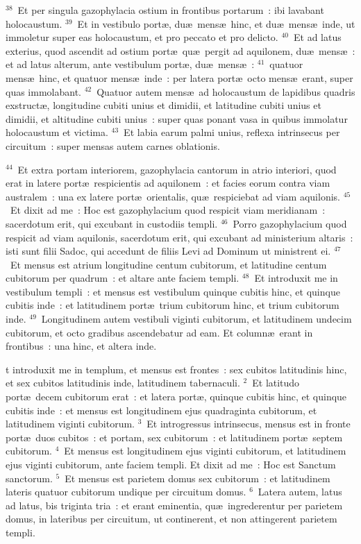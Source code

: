 ${}^{38}$~Et per singula gazophylacia ostium in frontibus portarum~: ibi lavabant holocaustum.
${}^{39}$~Et in vestibulo port\ae , du\ae\ mens\ae\ hinc, et du\ae\ mens\ae\ inde, ut immoletur super eas holocaustum, et pro peccato et pro delicto.
${}^{40}$~Et ad latus exterius, quod ascendit ad ostium port\ae\ qu\ae\ pergit ad aquilonem, du\ae\ mens\ae~: et ad latus alterum, ante vestibulum port\ae , du\ae\ mens\ae~:
${}^{41}$~quatuor mens\ae\ hinc, et quatuor mens\ae\ inde~: per latera port\ae\ octo mens\ae\ erant, super quas immolabant.
${}^{42}$~Quatuor autem mens\ae\ ad holocaustum de lapidibus quadris exstruct\ae , longitudine cubiti unius et dimidii, et latitudine cubiti unius et dimidii, et altitudine cubiti unius~: super quas ponant vasa in quibus immolatur holocaustum et victima.
${}^{43}$~Et labia earum palmi unius, reflexa intrinsecus per circuitum~: super mensas autem carnes oblationis.


${}^{44}$~Et extra portam interiorem, gazophylacia cantorum in atrio interiori, quod erat in latere port\ae\ respicientis ad aquilonem~: et facies eorum contra viam australem~: una ex latere port\ae\ orientalis, qu\ae\ respiciebat ad viam aquilonis.
${}^{45}$~Et dixit ad me~: Hoc est gazophylacium quod respicit viam meridianam~: sacerdotum erit, qui excubant in custodiis templi.
${}^{46}$~Porro gazophylacium quod respicit ad viam aquilonis, sacerdotum erit, qui excubant ad ministerium altaris~: isti sunt filii Sadoc, qui accedunt de filiis Levi ad Dominum ut ministrent ei.
${}^{47}$~Et mensus est atrium longitudine centum cubitorum, et latitudine centum cubitorum per quadrum~: et altare ante faciem templi.
${}^{48}$~Et introduxit me in vestibulum templi~: et mensus est vestibulum quinque cubitis hinc, et quinque cubitis inde~: et latitudinem port\ae\ trium cubitorum hinc, et trium cubitorum inde.
${}^{49}$~Longitudinem autem vestibuli viginti cubitorum, et latitudinem undecim cubitorum, et octo gradibus ascendebatur ad eam. Et column\ae\ erant in frontibus~: una hinc, et altera inde.

\bchapter
{}t introduxit me in templum, et mensus est frontes~: sex cubitos latitudinis hinc, et sex cubitos latitudinis inde, latitudinem tabernaculi.
${}^{2}$~Et latitudo port\ae\ decem cubitorum erat~: et latera port\ae , quinque cubitis hinc, et quinque cubitis inde~: et mensus est longitudinem ejus quadraginta cubitorum, et latitudinem viginti cubitorum.
${}^{3}$~Et introgressus intrinsecus, mensus est in fronte port\ae\ duos cubitos~: et portam, sex cubitorum~: et latitudinem port\ae\ septem cubitorum.
${}^{4}$~Et mensus est longitudinem ejus viginti cubitorum, et latitudinem ejus viginti cubitorum, ante faciem templi. Et dixit ad me~: Hoc est Sanctum sanctorum.
${}^{5}$~Et mensus est parietem domus sex cubitorum~: et latitudinem lateris quatuor cubitorum undique per circuitum domus.
${}^{6}$~Latera autem, latus ad latus, bis triginta tria~: et erant eminentia, qu\ae\ ingrederentur per parietem domus, in lateribus per circuitum, ut continerent, et non attingerent parietem templi.



